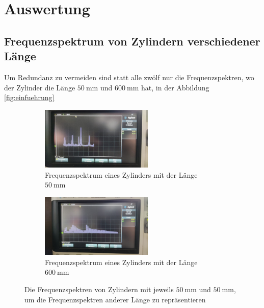 \section{Auswertung}
\label{sec:Auswertung}
\subsection{Frequenzspektrum von Zylindern verschiedener Länge}
Um Redundanz zu vermeiden sind statt alle zwölf nur die Frequenzspektren, wo der Zylinder die Länge $\qty{50}{\milli\meter}$ und $\qty{600}{\milli\meter}$ hat, in der Abbildung
\ref{fig:einfuehrung}
\begin{figure}
\begin{subfigure}{0.48\textwidth}%
\centering%
\includegraphics[height=3cm]{data_scripts/1.jpeg}%
\caption{Frequenzspektrum eines Zylinders mit der Länge $\qty{50}{\milli\meter}$}%
\label{fig:50os}%
\end{subfigure}%
\hfill%
\begin{subfigure}{0.48\textwidth}%
\centering%
\includegraphics[height=3cm]{data_scripts/12.jpeg}%
\caption{Frequenzspektrum eines Zylinders mit der Länge $\qty{600}{\milli\meter}$}%
\label{fig:600os}%
\end{subfigure}%
\caption{Die Frequenzspektren von Zylindern mit jeweils $\qty{50}{\milli\meter}$ und $\qty{50}{\milli\meter}$, um die Frequenzspektren anderer Länge zu repräsentieren}%
\label{fig:os}%
\end{figure}%
